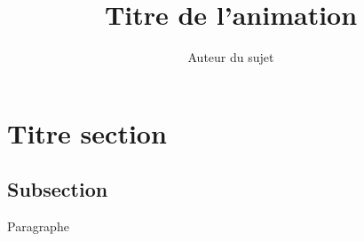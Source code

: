 \documentclass{animation-fablab}
\title{Titre de l'animation}
\author{Auteur du sujet}
\begin{document}
\section{Titre section}
\subsection{Subsection}
{Paragraphe}
\end{document}
